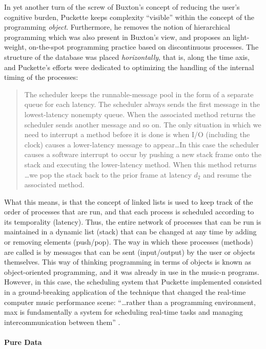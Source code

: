 	In yet another turn of the screw of Buxton's concept of reducing the user's cognitive burden, Puckette keeps complexity ``visible'' within the concept of the programming \textit{object}. Furthermore, he removes the notion of hierarchical programming which was also present in Buxton's view, and proposes an light-weight, on-the-spot programming practice based on discontinuous processes. The structure of the database was placed \textit{horizontally}, that is, along the time axis, and Puckette's efforts were dedicated to optimizing the handling of the internal timing of the processes:

	\begin{quote}
		The scheduler keeps the runnable-message pool in the form of a separate queue for each latency. The scheduler always sends the first message in the lowest-latency nonempty queue. When the associated method returns the scheduler sends another message and so on. The only situation in which we need to interrupt a method before it is done is when I/O (including the clock) causes a lower-latency message to appear\dots In this case the scheduler causes a software interrupt to occur by pushing a new stack frame onto the stack and executing the lower-latency method. When this method returns \dots we pop the stack back to the prior frame at latency \(d_2\) and resume the associated method. \parencite[46]{DBLP:conf/icmc/Puckette86}
	\end{quote}

	What this means, is that the concept of linked lists is used to keep track of the order of processes that are run, and that each process is scheduled according to its temporality (latency). Thus, the entire network of processes that can be run is maintained in a dynamic list (stack) that can be changed at any time by adding or removing elements (push/pop). The way in which these processes (methods) are called is by messages that can be sent (input/output) by the user or objects themselves. This way of thinking programming in terms of objects is known as object-oriented programming, and it was already in use in the \gls{music-n} programs. However, in this case, the scheduling system that Puckette implemented consisted in a ground-breaking application of the technique that changed the real-time computer music performance scene: ``\dots rather than a programming environment, \gls{max} is fundamentally a system for scheduling real-time tasks and managing intercommunication between them'' \parencite{DBLP:journals/comj/Puckette02}.

	\paragraph{Pure Data}
	\label{computer:puredata}

